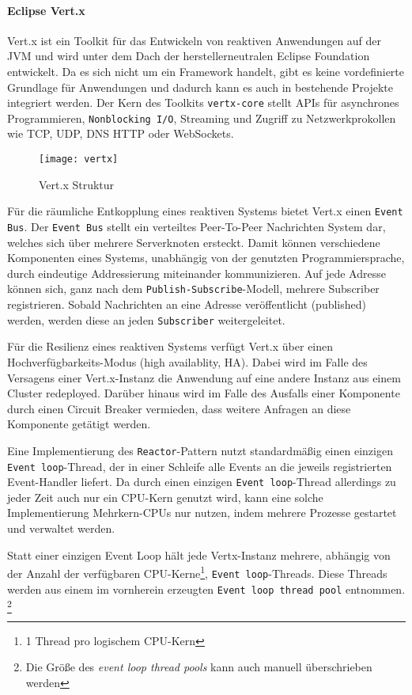 \paragraph{Eclipse Vert.x}
Vert.x ist ein Toolkit für das Entwickeln von reaktiven Anwendungen auf der JVM und wird unter dem Dach der herstellerneutralen Eclipse Foundation entwickelt.
Da es sich nicht um ein Framework handelt, gibt es keine vordefinierte Grundlage für Anwendungen und dadurch kann es auch in bestehende Projekte
integriert werden.
Der Kern des Toolkits \verb|vertx-core| stellt APIs für asynchrones Programmieren, \verb|Nonblocking I/O|, Streaming und Zugriff zu
Netzwerkprokollen wie TCP, UDP, DNS HTTP oder WebSockets.
\begin{figure}[h]
	\centering
	\texttt{[image: vertx]}
	\caption{Vert.x Struktur \parencite{Ponge2020}}
	\label{fig:vertx}
\end{figure}

Für die räumliche Entkopplung eines reaktiven Systems bietet Vert.x einen \verb|Event Bus|.
Der \verb|Event Bus| stellt ein verteiltes Peer-To-Peer Nachrichten System dar, welches sich über mehrere Serverknoten ersteckt.
Damit können verschiedene Komponenten eines Systems, unabhängig von der genutzten Programmiersprache, durch eindeutige Addressierung miteinander kommunizieren.
Auf jede Adresse können sich, ganz nach dem \verb|Publish-Subscribe|-Modell, mehrere Subscriber registrieren. Sobald Nachrichten an eine
Adresse veröffentlicht (published) werden, werden diese an jeden \verb|Subscriber| weitergeleitet.

Für die Resilienz eines reaktiven Systems verfügt Vert.x über einen Hochverfügbarkeits-Modus (high availablity, HA).
Dabei wird im Falle des Versagens einer Vert.x-Instanz die Anwendung auf eine andere Instanz aus einem Cluster redeployed.
Darüber hinaus wird im Falle des Ausfalls einer Komponente durch einen Circuit Breaker vermieden, dass weitere Anfragen an diese
Komponente getätigt werden.\newline

Eine Implementierung des \verb|Reactor|-Pattern nutzt standardmäßig einen einzigen \verb|Event loop|-Thread, der in einer Schleife alle
Events an die jeweils registrierten Event-Handler liefert.
Da durch einen einzigen \verb|Event loop|-Thread allerdings zu jeder Zeit auch nur ein CPU-Kern genutzt wird, kann
eine solche Implementierung Mehrkern-CPUs nur nutzen, indem mehrere Prozesse gestartet und verwaltet werden.

Statt einer einzigen Event Loop hält jede Vertx-Instanz mehrere, abhängig von der Anzahl der verfügbaren CPU-Kerne\footnote{1 Thread pro logischem CPU-Kern},
\verb|Event loop|-Threads. Diese Threads werden aus einem im vornherein erzeugten \verb|Event loop thread pool| entnommen.
\footnote{Die Größe des \textit{event loop thread pools} kann auch manuell überschrieben werden}

